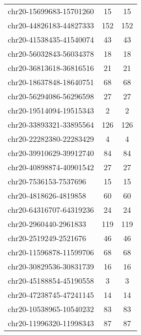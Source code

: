 \begin{longtable}{lSS}
	chr20-15699683-15701260 & 15     & 15                                  \\
	chr20-44826183-44827333 & 152    & 152                                 \\
	chr20-41538435-41540074 & 43     & 43                                  \\
	chr20-56032843-56034378 & 18     & 18                                  \\
	chr20-36813618-36816516 & 21     & 21                                  \\
	chr20-18637848-18640751 & 68     & 68                                  \\
	chr20-56294086-56296598 & 27     & 27                                  \\
	chr20-19514094-19515343 & 2      & 2                                   \\
	chr20-33893321-33895564 & 126    & 126                                 \\
	chr20-22282380-22283429 & 4      & 4                                   \\
	chr20-39910629-39912740 & 84     & 84                                  \\
	chr20-40898874-40901542 & 27     & 27                                  \\
	chr20-7536153-7537696   & 15     & 15                                  \\
	chr20-4818626-4819858   & 60     & 60                                  \\
	chr20-64316707-64319236 & 24     & 24                                  \\
	chr20-2960440-2961833   & 119    & 119                                 \\
	chr20-2519249-2521676   & 46     & 46                                  \\
	chr20-11596878-11599706 & 68     & 68                                  \\
	chr20-30829536-30831739 & 16     & 16                                  \\
	chr20-45188854-45190558 & 3      & 3                                   \\
	chr20-47238745-47241145 & 14     & 14                                  \\
	chr20-10538965-10540232 & 83     & 83                                  \\
	chr20-11996320-11998343 & 87     & 87                                  \\

\end{longtable}
